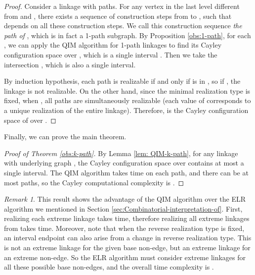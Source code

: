 \documentclass[secthm,amsthm,english]{article}
\theoremstyle{definition}
\theoremstyle{remark}
\newtheorem{remark}{Remark}
\begin{document}
\begin{proof}
Consider a linkage  with  paths. 
For any vertex  in the last level  different from  and , 
there exists a sequence of construction steps from  to , 
such that  depends on all these construction steps. 
We call this construction sequence \emph{the  path  of }, 
which is in fact a 1-path subgraph. By Proposition \ref{obs:1-path}, for each , 
we can apply the QIM algorithm for 1-path linkages to find its Cayley configuration space 
over , which is a single interval . 
Then we take the intersection , which is also a single interval. 

By induction hypothesis, each path  is realizable if and only if  is in , so if , the linkage is not realizable. 
On the other hand, since the minimal realization type is fixed, when , all paths are simultaneously realizable 
(each value of  corresponds to a unique realization of the entire linkage). 
Therefore,  is the Cayley configuration space of  over .  
\end{proof}





Finally, we can prove the main theorem. 

\begin{proof}[Proof of Theorem \ref{obs:k-path}]
By Lemma \ref{lem: QIM-k-path}, for any linkage with underlying graph , 
the Cayley configuration space over  contains at most a single interval. 
The QIM algorithm takes  time on each path, and there can be at most  paths, so 
the Cayley computational complexity is  . 
\end{proof}

\begin{remark} This result shows the advantage of the QIM algorithm over the ELR algorithm we mentioned in Section \ref{sec:Combinatorial-interpretation-of}. First, realizing each extreme linkage takes  time, 
therefore realizing all  extreme linkages from  takes  time. 
Moreover, note that when the reverse realization type is fixed, an interval endpoint can also arise from a change in reverse realization type. 
This is not an extreme linkage for the given base non-edge, but an extreme linkage for an extreme non-edge. 
So the ELR algorithm must consider extreme linkages for all these  possible base non-edges, 
 and the overall time complexity is .
\end{remark} 





\medskip
\end{document}
